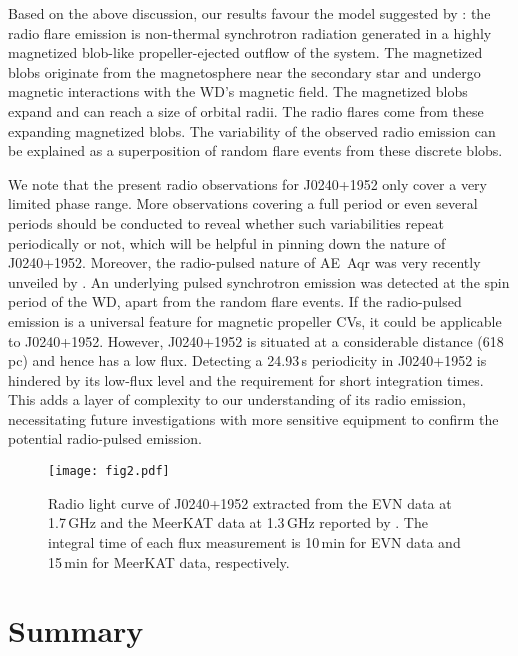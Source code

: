 \documentclass[fleqn,usenatbib]{mnras}
\begin{document}
Based on the above discussion, our results favour the model suggested by \citet{Meintjes2003}: the radio flare emission is non-thermal synchrotron radiation generated in a highly magnetized blob-like propeller-ejected outflow of the system. The magnetized blobs originate from the magnetosphere near the secondary star and undergo magnetic interactions with the WD's magnetic field. The magnetized blobs expand and can reach a size of orbital radii. The radio flares come from these expanding magnetized blobs. The variability of the observed radio emission can be explained as a superposition of random flare events from these discrete blobs.

We note that the present radio observations for J0240+1952 only cover a very limited phase range. More observations covering a full period or even several periods should be conducted to reveal whether such variabilities repeat periodically or not, which will be helpful in pinning down the nature of J0240+1952. Moreover, the radio-pulsed nature of AE~Aqr was very recently unveiled by \citet{Meintjes2023}. An underlying pulsed synchrotron emission was detected at the spin period of the WD, apart from the random flare events. If the radio-pulsed emission is a universal feature for magnetic propeller CVs, it could be applicable to J0240+1952. However, J0240+1952 is situated at a considerable distance (618\,pc) and hence has a low flux. Detecting a 24.93\,s periodicity in J0240+1952 is hindered by its low-flux level and the requirement for short integration times. This adds a layer of complexity to our understanding of its radio emission, necessitating future investigations with more sensitive equipment to confirm the potential radio-pulsed emission.

\begin{figure}
\centering
\texttt{[image: fig2.pdf]}
\caption{Radio light curve of J0240+1952 extracted from the EVN data at 1.7\,GHz and the MeerKAT data at 1.3\,GHz reported by \citet{Pretorius2021}. The integral time of each flux measurement is 10\,min for EVN data and 15\,min for MeerKAT data, respectively.}
 \label{fig:fig2}
\end{figure}

\section{Summary}
\label{sec:section4}
\end{document}
